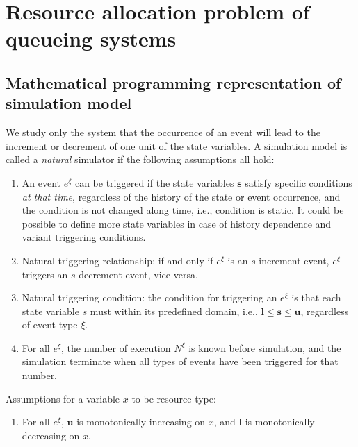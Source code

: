 \documentclass[]{interact}
\theoremstyle{plain}%
\theoremstyle{definition}
\theoremstyle{remark}
\begin{document}
\section{Resource allocation problem of queueing systems}
\subsection{Mathematical programming representation of simulation model}
We study only the system that the occurrence of an event will lead to the increment or decrement of one unit of the state variables. A simulation model is called a \textit{natural} simulator if the following assumptions all hold:
\begin{enumerate}
		\item An event $e^{\xi}$ can be triggered if the state variables $\mathbf{s}$ satisfy specific conditions \textit{at that time}, regardless of the history of the state or event occurrence, and the condition is not changed along time, i.e., condition is static. It could be possible to define more state variables in case of history dependence and variant triggering conditions.
		\item Natural triggering relationship: if and only if $e^{\xi}$ is an $s$-increment event, $e^{\xi}$ triggers an $s$-decrement event, vice versa.
		\item Natural triggering condition: the condition for triggering an $e^{\xi}$ is that each state variable $s$ must within its predefined domain, i.e., $\mathbf{l} \le\mathbf{s}\le \mathbf{u}$, regardless of event type $\xi$.
		\item For all $e^{\xi}$, the number of execution $N^{\xi}$ is known before simulation, and the simulation terminate when all types of events have been triggered for that number.
\end{enumerate}

Assumptions for a variable $x$ to be resource-type:
\begin{enumerate}
	\item For all $e^{\xi}$, $\mathbf{u}$ is monotonically increasing on $x$, and $\mathbf{l}$ is monotonically decreasing on $x$.
\end{enumerate}
\end{document}
